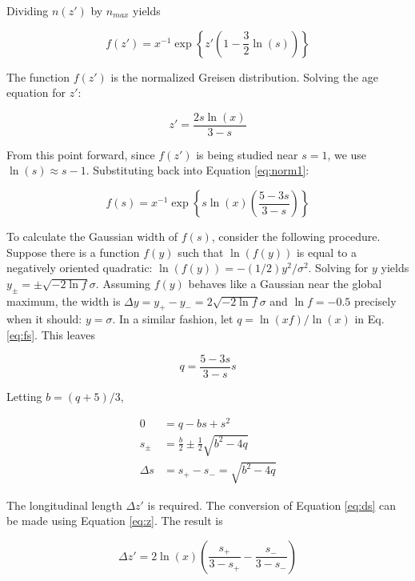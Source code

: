 \documentclass[amsmath,amssymb,aps,prd,10pt,twocolumn]{revtex4}
\begin{document}
Dividing $n(z')$ by $n_{max}$ yields

\begin{equation}
f(z') = x^{-1} \exp \left \lbrace z'\left(1 - \frac{3}{2}\ln(s) \right) \right \rbrace \label{eq:norm1}
\end{equation}

The function $f(z')$ is the normalized Greisen distribution.  Solving the age equation for $z'$:

\begin{equation}
z' = \frac{2s\ln(x)}{3-s} \label{eq:z}
\end{equation}

From this point forward, since $f(z')$ is being studied near $s = 1$, we use $\ln(s) \approx s - 1$. Substituting back into Equation \ref{eq:norm1}:

\begin{equation}
f(s) = x^{-1} \exp \left \lbrace s \ln(x) \left( \frac{5 - 3 s}{3 - s} \right) \right \rbrace \label{eq:fs}
\end{equation}

To calculate the Gaussian width of $f(s)$, consider the following procedure.  Suppose there is a function $f(y)$ such that $\ln(f(y))$ is equal to a negatively oriented quadratic: $\ln(f(y)) = -(1/2) y^2/\sigma^2$.  Solving for $y$ yields $y_{\pm} = \pm \sqrt{-2 \ln f} \sigma$.  Assuming $f(y)$ behaves like a Gaussian near the global maximum, the width is $\Delta y = y_{+} - y_{-} = 2\sqrt{-2 \ln f} \sigma$ and $\ln f = -0.5$ precisely when it should: $y = \sigma$.  In a similar fashion, let $q = \ln(xf)/\ln(x)$ in Eq. \ref{eq:fs}.  This leaves

\begin{equation}
q = \frac{5-3s}{3-s}s
\end{equation}

Letting $b = (q+5)/3$,

\begin{align}
0 &= q - b s + s^2 \\
s_{\pm} &= \frac{b}{2} \pm \frac{1}{2} \sqrt{b^2 - 4 q} \\
\Delta s &= s_{+} - s_{-} = \sqrt{b^2 - 4 q} \label{eq:ds}
\end{align}

The longitudinal length $\Delta z'$ is required.  The conversion of Equation \ref{eq:ds} can be made using Equation \ref{eq:z}.  The result is

\begin{equation}
\Delta z' = 2 \ln(x) \left( \frac{s_{+}}{3-s_{+}} - \frac{s_{-}}{3-s_{-}} \right)
\end{equation}
\end{document}
